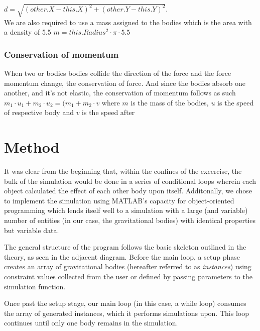 \documentclass[11pt]{article}
\begin{document}
$d = \sqrt{(other.X - this.X)^{2} + (other.Y - this.Y)^{2}}$.\\

We are also required to use a mass assigned to the bodies which is the area with a density of 5.5
$m = this.Radius^{2} \cdot \pi \cdot 5.5$\\



\subsubsection{Conservation of momentum}
When two or bodies bodies collide the direction of the force and the force momentum change, the conservation of force. And since the bodies absorb one another, and it's not elastic, the conservation of momentum follows as such
$m_{1} \cdot u_{1} + m_{2} \cdot u_{2} = (m_{1} + m_{2} \cdot v$
where $m$ is the mass of the bodies, $u$ is the speed of respective body and $v$ is the speed after

\pagebreak
\section{Method}
It was clear from the beginning that, within the confines of the excercise, the bulk of the simulation would be done in a series of conditional loops wherein each object calculated the effect of each other body upon itself. Additonally, we chose to implement the simulation using MATLAB's capacity for object-oriented programming which lends itself well to a simulation with a large (and variable) number of entities (in our case, the gravitational bodies) with identical properties but variable data.

The general structure of the program follows the basic skeleton outlined in the theory, as seen in the adjacent diagram. Before the main loop, a setup phase creates an array of gravitational bodies (hereafter referred to as \emph{instances}) using constraint values collected from the user or defined by passing parameters to the simulation function.

Once past the setup stage, our main loop (in this case, a while loop) consumes the array of generated instances, which it performs simulations upon. This loop continues until only one body remains in the simulation. 
\end{document}
